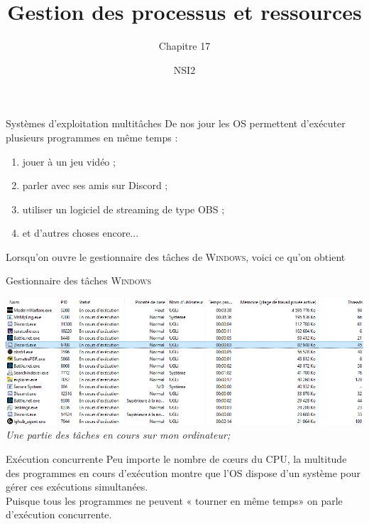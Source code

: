 \documentclass[10pt]{beamer}
\title{Gestion des processus et ressources}
\subtitle{Chapitre 17}
\author{NSI2}
\begin{document}
\maketitle
{}
\begin{frame}{Systèmes d'exploitation multitâches}\pause
De nos jour les OS permettent d'exécuter plusieurs programmes en même temps :\\\pause

\begin{enumerate}[--]
	\item jouer à un jeu vidéo ;\pause
    \item parler avec ses amis sur Discord ;\pause
    \item utiliser un logiciel de streaming de type OBS ;\pause
    \item et d'autres choses encore...\pause
\end{enumerate}
Lorsqu'on ouvre le gestionnaire des tâches de \textsc{Windows}, voici ce qu'on obtient
\end{frame}
\begin{frame}{Gestionnaire des tâches \textsc{Windows}}
\begin{center}
\includegraphics[width=\linewidth]{img/gest}\\

\small \textit{Une partie des tâches en cours sur mon ordinateur;}
\end{center}
\end{frame}
\begin{frame}{Exécution concurrente}\pause
Peu importe le nombre de c\oe urs du CPU, la multitude des programmes en cours d'exécution montre que l'OS dispose d'un système pour gérer ces exécutions simultanées.\\\pause
Puisque tous les programmes ne peuvent « tourner en même temps» on parle d'\alert{exécution concurrente}.
\end{frame}
\end{document}

